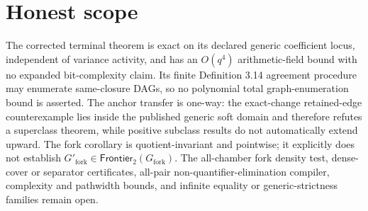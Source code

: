 \documentclass{article}
\begin{document}
\section{Honest scope}

The corrected terminal theorem is exact on its declared generic coefficient locus, independent of variance activity, and has an \(O(q^4)\) arithmetic-field bound with no expanded bit-complexity claim. Its finite Definition 3.14 agreement procedure may enumerate same-closure DAGs, so no polynomial total graph-enumeration bound is asserted. The anchor transfer is one-way: the exact-change retained-edge counterexample lies inside the published generic soft domain and therefore refutes a superclass theorem, while positive subclass results do not automatically extend upward. The fork corollary is quotient-invariant and pointwise; it explicitly does not establish \(G'_{\mathrm{fork}}\in\mathsf{Frontier}_2(G_{\mathrm{fork}})\). The all-chamber fork density test, dense-cover or separator certificates, all-pair non-quantifier-elimination compiler, complexity and pathwidth bounds, and infinite equality or generic-strictness families remain open.
\end{document}
